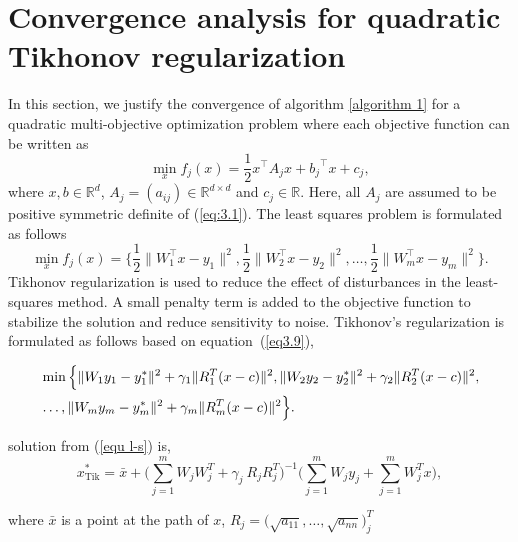 \documentclass[smallextended,referee,envcountsect]{svjour3}
\begin{document}
\section{Convergence analysis for quadratic Tikhonov regularization}\label{sec4}
In this section, we justify the convergence of algorithm  \ref{algorithm 1} for a quadratic multi-objective optimization problem where each objective function can be written as
\begin{equation}
\label{eq:3.1}
\min_{x} f_j(x) = \frac{1}{2} x^{\top} A_j x + {b_j}^{\top} x + c_j,
\end{equation}
where $x, {b} \in \mathbb{R}^{d}$, $A_j = (a_{ij}) \in \mathbb{R}^{d \times d}$ and $c_j \in \mathbb{R}$. Here, all $A_j$ are assumed to be positive symmetric definite of (\ref{eq:3.1}). The least squares problem is formulated as follows
\begin{equation}\label{eq3.9}
\min_{x} f_j(x) = \Big\{\frac{1}{2} \Big\| W_1^{\top} x -  {y_1} \Big\|^2, \frac{1}{2} \Big\| W_2^{\top} x -  {y_2} \Big\|^2, \dots, \frac{1}{2} \Big\| W_m^{\top} x -  {y_m} \Big\|^2\Big\}.
\end{equation}
Tikhonov regularization is used to reduce the effect of disturbances in the least-squares method. A small penalty term is added to the objective function to stabilize the solution and reduce sensitivity to noise. Tikhonov’s regularization is formulated as follows based on equation~(\ref{eq3.9}),

\begin{align}\label{equ l-s}
&\min \Big\{ \|W_1 y_1 - y_1^{*}\|^2 + \gamma_1 \|R_1^T(x-c)\|^2 ,\|W_2 y_2 - y_2^{*}\|^2 + \gamma_2 \|R_2^T(x-c)\|^2 ,\notag\\
&\dots, \|W_m y_m - y_m^{*}\|^2 + \gamma_m \|R_m^T(x-c)\|^2 \Big\}.
\end{align}

 solution from (\ref{equ l-s}) is,
\begin{equation}
x^*_{\text{Tik}} = \bar{x} + \Big( \sum_{j=1}^{m} W_j W_j^T + \gamma_j~R_j R_j^T \Big)^{-1} \Big( \sum_{j=1}^{m} W_j y_j + \sum_{j=1}^{m} W_j^T x \Big),
\end{equation}

where $\bar{x}$ is a point at the path of $x$, \quad $R_j = \Big(\sqrt{a_{11}},\dots, \sqrt{a_{nn}}\Big)^T_j$\\
\end{document}
